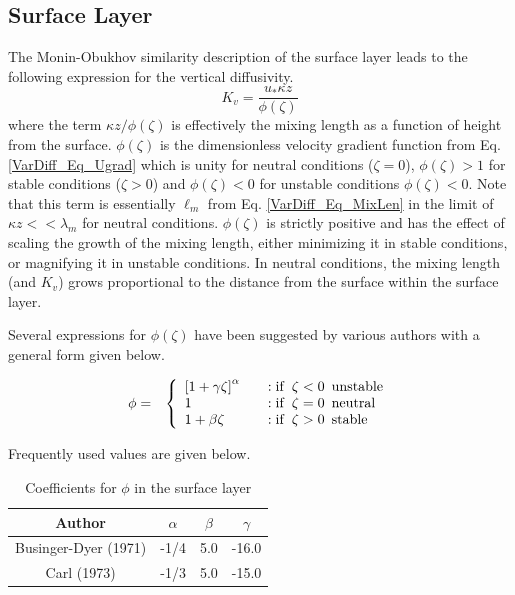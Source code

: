 \subsection{Surface Layer}

The Monin-Obukhov similarity description of the surface layer leads to the following
expression for the vertical diffusivity.
\begin{equation}\label{VarDiff_Eq_Kz_Surf}
K_v = \frac{u_{*} \kappa z}{\phi(\zeta)}
\end{equation}
where the term $\kappa z / \phi(\zeta)$ is effectively the mixing length as a function of height from the
surface. $\phi(\zeta)$ is the dimensionless velocity gradient 
function from Eq. \ref{VarDiff_Eq_Ugrad} which is unity for neutral conditions ($\zeta=0$),
$\phi(\zeta)>1$ for stable conditions ($\zeta>0$) and $\phi(\zeta)<0$ for unstable
conditions $\phi(\zeta)<0$.
Note that this term is essentially $\ell_m$ from Eq. \ref{VarDiff_Eq_MixLen} in the limit of
$\kappa z << \lambda_m$ for neutral conditions. $\phi(\zeta)$ is strictly positive and
has the effect of scaling the growth of the mixing length, either minimizing it in
stable conditions, or magnifying it in unstable conditions. In neutral conditions, the
mixing length (and $K_v$) grows proportional to the distance from the surface within the
surface layer. 

Several expressions for $\phi(\zeta)$ have been suggested by various authors with a
general form given below.

\begin{eqnarray}\label{VarDiff_Eq_PhiB}
\phi &=& \left\{ \begin{array} {l@{\quad \quad}l}
 \left[ 1+\gamma \zeta\right]^{\alpha}  &:  \mathrm{if}\,\,\, \zeta < 0 \,\,\, \mathrm{unstable} \\
1                                       &:  \mathrm{if}\,\,\, \zeta = 0 \,\,\, \mathrm{neutral} \\
1 + \beta \zeta                         &:  \mathrm{if}\,\,\, \zeta > 0 \,\,\, \mathrm{stable}
\end{array}
\right.
\end{eqnarray}

Frequently used values are given below.
\small
\begin{table}[htbp]
\begin{center}
\begin{tabular}{| c | c | c | c |}
\hline
Author & $\alpha$ & $\beta$ & $\gamma$\\
\hline
Businger-Dyer (1971)     & -1/4 & 5.0 & -16.0 \\
Carl (1973)              & -1/3 & 5.0 & -15.0 \\
\hline
\end{tabular}
\caption{\label{Tab_VarDiff_phisurf}Coefficients for $\phi$ in the surface layer}
\end{center}
\end{table}
\normalsize

